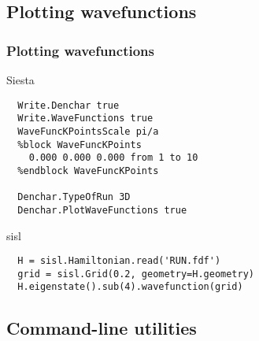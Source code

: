 \subsection{Plotting wavefunctions}

\begin{frame}[fragile]
  \frametitle{Plotting wavefunctions}

  \begin{block}{Siesta}
\begin{verbatim}
  Write.Denchar true
  Write.WaveFunctions true
  WaveFuncKPointsScale pi/a
  %block WaveFuncKPoints
    0.000 0.000 0.000 from 1 to 10
  %endblock WaveFuncKPoints

  Denchar.TypeOfRun 3D
  Denchar.PlotWaveFunctions true
\end{verbatim}
    
  \end{block}

  \begin{block}{sisl}

\begin{verbatim}
  H = sisl.Hamiltonian.read('RUN.fdf')
  grid = sisl.Grid(0.2, geometry=H.geometry)
  H.eigenstate().sub(4).wavefunction(grid)
\end{verbatim}
  \end{block}
  
\end{frame}


\subsection{Command-line utilities}

